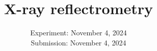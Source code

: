 

\publishers{TU Dortmund – Department of Physics}

\subject{\texorpdfstring{\vspace{2ex}}{}V44\texorpdfstring{\vspace{-2ex}}{}} %
\title{X-ray reflectrometry} %
\date{
	Experiment: November 4, 2024 %
	\\ Submission: November 4, 2024 %
}




\maketitle
\thispagestyle{empty}

\tableofcontents
\newpage








\printbibliography{}

\newpage



